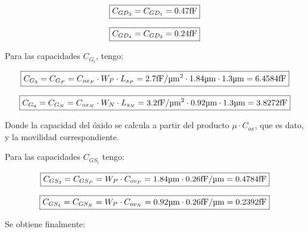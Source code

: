 \begin{equation*}
\boxed{ C_{GD_{3}} = C_{GD_{1}} = 0.47 \si[per-mode=symbol]{\femto\farad} }
\end{equation*}


\begin{equation*}
\boxed{ C_{GD_{4}} = C_{GD_{2}} = 0.24 \si[per-mode=symbol]{\femto\farad} }
\end{equation*}



Para las capacidades $C_{G_{i}}$, tengo:

\begin{equation*}
\boxed{ C_{G_{3}} = C_{G_{P}} = C_{ox_{P}} \cdot W_{P} \cdot L_{s_{P}} = 2.7 \si[per-mode=symbol]{\femto\farad\per\micro\meter\squared} \cdot 1.84 \si[per-mode=symbol]{\micro\meter} \cdot 1.3 \si[per-mode=symbol]{\micro\meter} = 6.4584 \si[per-mode=symbol]{\femto\farad} }
\end{equation*}


\begin{equation*}
\boxed{ C_{G_{4}} = C_{G_{N}} = C_{ox_{N}} \cdot W_{N} \cdot L_{s_{N}} = 3.2 \si[per-mode=symbol]{\femto\farad\per\micro\meter\squared} \cdot 0.92 \si[per-mode=symbol]{\micro\meter} \cdot 1.3 \si[per-mode=symbol]{\micro\meter} = 3.8272 \si[per-mode=symbol]{\femto\farad} }
\end{equation*}



Donde la capacidad del óxido se calcula a partir del producto $\mu \cdot C_{ox}$, que es dato, y la movilidad correspondiente.



Para las capacidades $C_{GS_{i}}$ tengo:


\begin{equation*}
\boxed{ C_{GS_{3}} = C_{GS_{P}} = W_{P} \cdot C_{ov_{P}} = 1.84 \si[per-mode=symbol]{\micro\meter} \cdot 0.26 \si[per-mode=symbol]{\femto\farad\per\micro\meter} = 0.4784 \si[per-mode=symbol]{\femto\farad} }
\end{equation*}


\begin{equation*}
\boxed{ C_{GS_{4}} = C_{GS_{N}} = W_{P} \cdot C_{ov_{N}} = 0.92 \si[per-mode=symbol]{\micro\meter} \cdot 0.26 \si[per-mode=symbol]{\femto\farad\per\micro\meter} = 0.2392 \si[per-mode=symbol]{\femto\farad} }
\end{equation*}





Se obtiene finalmente:


